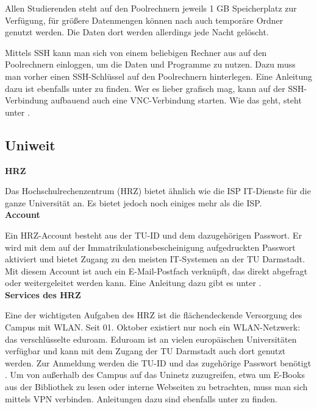 {Allen Studierenden steht auf den Poolrechnern jeweils 1 GB Speicherplatz zur Verfügung, für größere Datenmengen können nach \footnotemark[4] auch temporäre Ordner genutzt werden. Die Daten dort werden allerdings jede Nacht gelöscht.

Mittels SSH \footnotemark[5] kann man sich von einem beliebigen Rechner aus auf den Poolrechnern einloggen, um die Daten und Programme zu nutzen. Dazu muss man vorher einen SSH-Schlüssel auf den Poolrechnern hinterlegen. Eine Anleitung dazu ist ebenfalls unter \footnotemark[5] zu finden.
Wer es lieber grafisch mag, kann auf der SSH-Verbindung aufbauend auch eine VNC-Verbindung starten. Wie das geht, steht unter \footnotemark[6].\\

\subsection*{Uniweit}

\noindent\textbf{HRZ}

Das Hochschulrechenzentrum (HRZ) \footnotemark[10] bietet ähnlich wie die ISP IT-Dienste für die ganze Universität an. Es bietet jedoch noch einiges mehr als die ISP.\\

\noindent\textbf{Account}

Ein HRZ-Account besteht aus der TU-ID und dem dazugehörigen Passwort. Er wird mit dem auf der Immatrikulationsbescheinigung aufgedruckten Passwort aktiviert und bietet Zugang zu den meisten IT-Systemen an der TU Darmstadt. Mit diesem Account ist auch ein E-Mail-Postfach verknüpft, das direkt abgefragt oder weitergeleitet werden kann. Eine Anleitung dazu gibt es unter \footnotemark[11].\\

\noindent\textbf{Services des HRZ}

Eine der wichtigsten Aufgaben des HRZ ist die flächendeckende Versorgung des Campus mit WLAN. Seit 01. Oktober existiert nur noch ein WLAN-Netzwerk: das verschlüsselte eduroam. Eduroam ist an vielen europäischen Universitäten verfügbar und kann mit dem Zugang der TU Darmstadt auch dort genutzt werden. Zur Anmeldung werden die TU-ID und das zugehörige Passwort benötigt \footnotemark[12]. Um von außerhalb des Campus auf das Uninetz zuzugreifen, etwa um E-Books aus der Bibliothek zu lesen oder interne Webseiten zu betrachten, muss man sich mittels VPN verbinden. Anleitungen dazu sind ebenfalls unter \footnotemark[12] zu finden.

}
